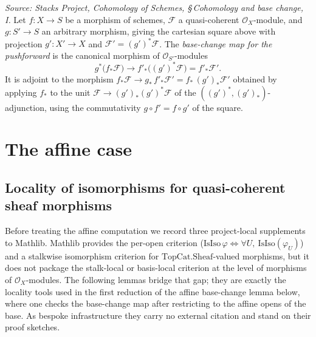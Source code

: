\begin{definition}
  \label{def:pushforward_base_change_map}
  \textit{Source: Stacks Project, Cohomology of Schemes, \S\,Cohomology and base
  change, I.}
  Let \(f : X \to S\) be a morphism of schemes, \(\mathcal{F}\) a quasi-coherent
  \(\mathcal{O}_X\)-module, and \(g : S' \to S\) an arbitrary morphism, giving the
  cartesian square above with projection \(g' : X' \to X\) and
  \(\mathcal{F}' = (g')^*\mathcal{F}\). The \emph{base-change map for the
  pushforward} is the canonical morphism of \(\mathcal{O}_{S'}\)-modules
  \[
    g^*\bigl(f_*\mathcal{F}\bigr) \longrightarrow f'_*\bigl((g')^*\mathcal{F}\bigr)
    = f'_*\mathcal{F}' .
  \]
  It is adjoint to the morphism
  \(f_*\mathcal{F} \to g_*\, f'_*\mathcal{F}' = f_*\,(g')_*\mathcal{F}'\) obtained
  by applying \(f_*\) to the unit
  \(\mathcal{F} \to (g')_*(g')^*\mathcal{F}\) of the
  \(((g')^*, (g')_*)\)-adjunction, using the commutativity
  \(g \circ f' = f \circ g'\) of the square.
\end{definition}

\section{The affine case}

\subsection{Locality of isomorphisms for quasi-coherent sheaf morphisms}

Before treating the affine computation we record three project-local supplements
to Mathlib. Mathlib provides the per-open criterion
(\(\mathrm{IsIso}\,\varphi \iff \forall U,\ \mathrm{IsIso}(\varphi_U)\)) and a
stalkwise isomorphism criterion for \(\mathrm{TopCat.Sheaf}\)-valued morphisms, but
it does not package the stalk-local or basis-local criterion at the level of
morphisms of \(\mathcal{O}_X\)-modules. The following lemmas bridge that gap; they
are exactly the locality tools used in the first reduction of the affine
base-change lemma below, where one checks the base-change map after restricting to
the affine opens of the base. As bespoke infrastructure they carry no external
citation and stand on their proof sketches.

